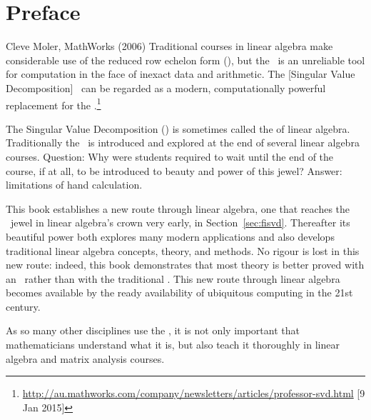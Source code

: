 
\maketitle


\tableofcontents


\chapter*{Preface}


\begin{quoted}{Cleve Moler, MathWorks (2006)}
Traditional courses in linear algebra make considerable use of the reduced row echelon form (\rref), but the \rref\ is an unreliable tool for computation in the face of inexact data and arithmetic. 
The [Singular Value Decomposition] \svd\ can be regarded as a modern, computationally powerful replacement for the \rref.\footnote{\url{http://au.mathworks.com/company/newsletters/articles/professor-svd.html} [9 Jan 2015]}
\end{quoted}

The Singular Value Decomposition (\svd) is sometimes called the \emph{} of linear algebra.
Traditionally the \svd\ is introduced and explored at the end of several linear algebra courses.
Question: Why were students required to wait until the end of the course, if at all, to be introduced to beauty and power of this jewel?
Answer: limitations of hand calculation.

This book establishes a new route through linear algebra, one that reaches the \svd\ jewel in linear algebra's crown very early, in Section~\ref{sec:fisvd}.
Thereafter its beautiful power both explores many modern applications and also develops traditional linear algebra concepts, theory, and methods.
No rigour is lost in this new route: indeed, this book demonstrates that most theory is better proved with an \svd\ rather than with the traditional \rref.
This new route through linear algebra becomes available by the ready availability of ubiquitous computing in the 21st century.


\begin{quoted}{\cite[p.30]{Turner2014}}
As so many other disciplines use the \svd, it is not only important that mathematicians understand what it is, but also teach it thoroughly in linear algebra and matrix analysis courses.
\end{quoted}








